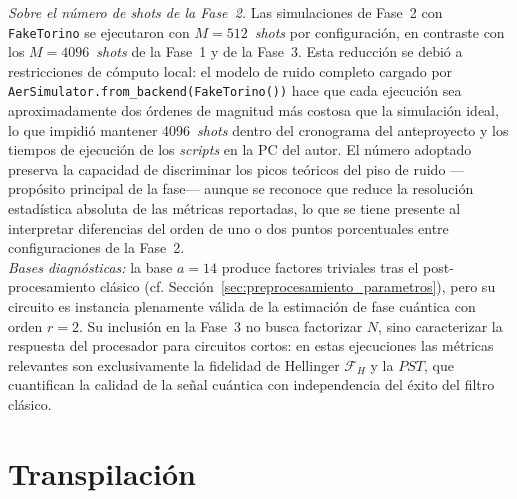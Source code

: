 \documentclass[12pt, spanish]{book}
\begin{document}
\textit{Sobre el número de shots de la Fase~2.} Las simulaciones de Fase~2 con \texttt{FakeTorino} se ejecutaron con $M = 512$~\textit{shots} por configuración, en contraste con los $M = 4096$~\textit{shots} de la Fase~1 y de la Fase~3. Esta reducción se debió a restricciones de cómputo local: el modelo de ruido completo cargado por \texttt{AerSimulator.from\_backend(FakeTorino())} hace que cada ejecución sea aproximadamente dos órdenes de magnitud más costosa que la simulación ideal, lo que impidió mantener 4096~\textit{shots} dentro del cronograma del anteproyecto y los tiempos de ejecución de los \textit{scripts} en la PC del autor. El número adoptado preserva la capacidad de discriminar los picos teóricos del piso de ruido ---propósito principal de la fase--- aunque se reconoce que reduce la resolución estadística absoluta de las métricas reportadas, lo que se tiene presente al interpretar diferencias del orden de uno o dos puntos porcentuales entre configuraciones de la Fase~2.\\

\textit{Bases diagnósticas:} la base $a = 14$ produce factores triviales tras el post-procesamiento clásico (cf. Sección~\ref{sec:preprocesamiento_parametros}), pero su circuito es instancia plenamente válida de la estimación de fase cuántica con orden $r = 2$. Su inclusión en la Fase~3 no busca factorizar $N$, sino caracterizar la respuesta del procesador para circuitos cortos: en estas ejecuciones las métricas relevantes son exclusivamente la fidelidad de Hellinger $\mathcal{F}_H$ y la $PST$, que cuantifican la calidad de la señal cuántica con independencia del éxito del filtro clásico.

\section{Transpilación}
\label{sec:transpilacion}
\end{document}
